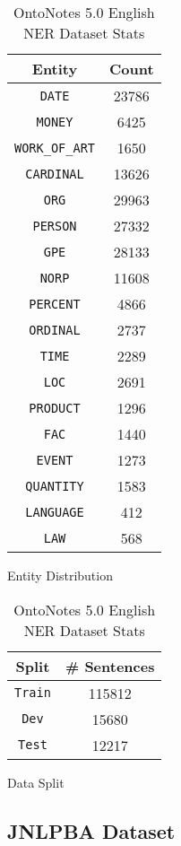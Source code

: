 \begin{table}[h!]
\begin{subtable}[t]{.48\linewidth}
\centering
\begin{tabular}{|c|c|}\hline
	\textbf{Entity} & \textbf{Count}\\\hline
	\texttt{DATE} & 23786\\\hline
    \texttt{MONEY} & 6425\\\hline
    \texttt{WORK\_OF\_ART} & 1650\\\hline
    \texttt{CARDINAL} & 13626\\\hline
    \texttt{ORG} & 29963\\\hline
    \texttt{PERSON} & 27332\\\hline
    \texttt{GPE} & 28133\\\hline
    \texttt{NORP} & 11608\\\hline
    \texttt{PERCENT} & 4866\\\hline
    \texttt{ORDINAL} & 2737\\\hline
    \texttt{TIME} & 2289\\\hline
    \texttt{LOC} & 2691\\\hline
    \texttt{PRODUCT} & 1296\\\hline
    \texttt{FAC} & 1440\\\hline
    \texttt{EVENT} & 1273\\\hline
    \texttt{QUANTITY} & 1583\\\hline
    \texttt{LANGUAGE} & 412\\\hline
    \texttt{LAW} & 568\\\hline
	\end{tabular}
	\caption{Entity Distribution}
	\label{tab:onto_entity_distribution}
\end{subtable}
\begin{subtable}[t]{.48\linewidth}
\centering
\begin{tabular}{|c|c|}\hline
	\textbf{Split} & \textbf{\# Sentences}\\\hline
	\texttt{Train} & 115812\\\hline
	\texttt{Dev} & 15680\\\hline
	\texttt{Test} & 12217\\\hline
	\end{tabular}
	\caption{Data Split}
	\label{tab:onto_dataset_split}
\end{subtable}
\caption{OntoNotes 5.0 English NER Dataset Stats}
\end{table}

\subsection{JNLPBA Dataset}

